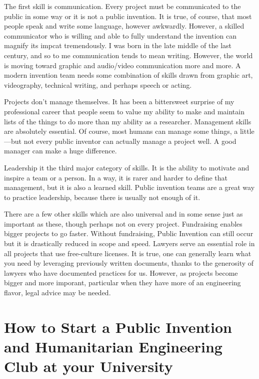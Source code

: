 \documentclass[
	fontsize=10pt, %
	twoside=false, %
	secnumdepth=1, %
]{kaobook}
\begin{document}
The first skill is communication. Every project must be communicated to the public in some way
or it is not a public invention. It is true, of course, that most people speak and write some language,
however awkwardly. However, a skilled communicator who is willing and able to fully understand the
invention can magnify its impcat tremendously.
I was born in the late middle of the last century, and so to me communication tends to mean writing.
However, the world is moving toward graphic and audio/video communication more and more.
A modern invention team needs some combination of skills drawn from graphic art, videography,
technical writing, and perhaps speech or acting.

Projects don't manage themselves. It has been a bittersweet surprise of my professional career that
people seem to value my ability to make and maintain lists of the things to do more than my ability
as a researcher. Management skills are absolutely essential. Of course, most humans can manage
some things, a little---but not every public inventor can actually manage a project well. A good manager
can make a huge difference.

Leadership it the third major category of skills. It is the ability to motivate and inspire a team
or a person. In a way, it is rarer and harder to define that management, but it is also a learned
skill. Public invention teams are a great way to practice leadership, because there is usually
not enough of it.

There are a few other skills which are also universal and in some sense just as important as these,
though perhaps not on every project. Fundraising enables bigger projects to go faster.
Without fundraising, Public Invention can still occur but it is drastically reduced in scope
and speed. Lawyers serve an essential role in all projects that use free-culture licenses.
It is true, one can generally learn what you need by leveraging previously written documents, thanks to the generosity of
lawyers who have documented practices for us. However, as projects become bigger and more imporant,
particular when they have more of an engineering flavor, legal advice may be needed.

\chapter{How to Start a Public Invention and Humanitarian Engineering Club at your University}

\label{sec:piheclub}
\end{document}
